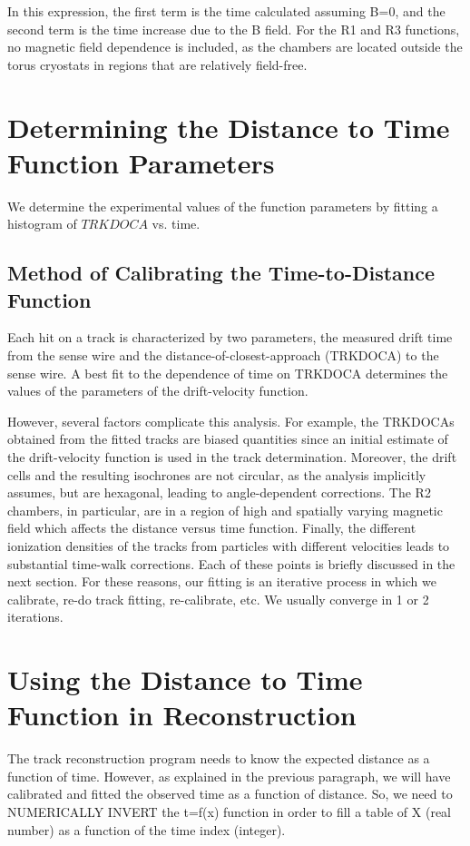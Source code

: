 \noindent
In this expression, the first term is the time calculated assuming B=0, and the
second term is the time increase due to the B field.  For the R1 and R3 functions, no magnetic field 
dependence is included, as the chambers are located outside the torus 
cryostats in regions that are relatively field-free.


\section{Determining the Distance to Time Function Parameters}
We determine the experimental values of the function parameters by fitting
a histogram of $TRKDOCA$ vs. time.

\subsection{Method of Calibrating the Time-to-Distance Function}
\label{tdistcal}

Each hit on a track is characterized by two parameters, the measured drift 
time from the sense wire and the distance-of-closest-approach (TRKDOCA) to the 
sense wire.  A best fit to the dependence of time on TRKDOCA determines the
values of the parameters of the drift-velocity function. 

However, several factors 
complicate this analysis. For example, the TRKDOCAs obtained from the fitted 
tracks are biased quantities since an initial estimate of the drift-velocity 
function is used in the track determination.  Moreover, the drift cells and
the resulting isochrones are 
not circular, as the analysis implicitly assumes, but are hexagonal, leading 
to angle-dependent corrections.   The R2 chambers, in particular, are in a 
region of high and spatially varying magnetic field which affects the distance
versus time function.  Finally, the different 
ionization densities of the tracks from particles with different velocities 
leads to substantial time-walk corrections.  Each of 
these points is briefly discussed in the next section.
For these reasons, our fitting is an iterative process in which we calibrate,
re-do track fitting, re-calibrate, etc.  We usually converge in 1 or 2 iterations.

\section{Using the Distance to Time Function in Reconstruction}
The track reconstruction program needs to know the expected distance as a function
of time.  However, as explained in the previous paragraph, we will have calibrated and fitted
the observed time as a function of distance.  So, we need to NUMERICALLY INVERT the t=f(x)
function in order to fill a table of X (real number) as a function of the time index (integer).

